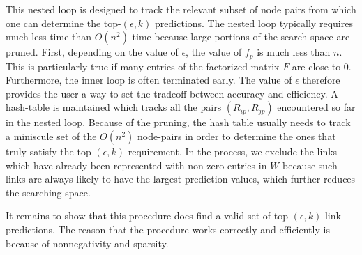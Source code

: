 This nested loop is designed to track the relevant subset of node
pairs from which one can determine the top-$(\epsilon, k)$
predictions.  The nested loop typically requires much less time than
$O(n^2)$ time because large portions of the search space are pruned.
First, depending on the value of $\epsilon$, the value of $f_p$ is
much less than $n$.  This is particularly true if many entries of
the factorized matrix $F$ are close to 0.  Furthermore, the inner
loop is often terminated early. The value of $\epsilon$ therefore
provides the user a way to set the tradeoff between accuracy and
efficiency. A hash-table is maintained which tracks all the pairs
$(R_{ip}, R_{jp})$ encountered so far in the nested loop. Because of
the pruning, the hash table usually needs to track a miniscule set
of the $O(n^2)$ node-pairs in order to determine the ones that truly satisfy the top-$(\epsilon, k)$ requirement. In the process, we exclude
the links which have already been represented with non-zero entries in $W$
because such links are always likely to have the largest prediction values,
which further reduces the searching space.


 It remains to show that this procedure does find a valid set of top-$(\epsilon,
k)$ link predictions. The reason that the procedure works correctly
and efficiently  is because of nonnegativity and sparsity. 


